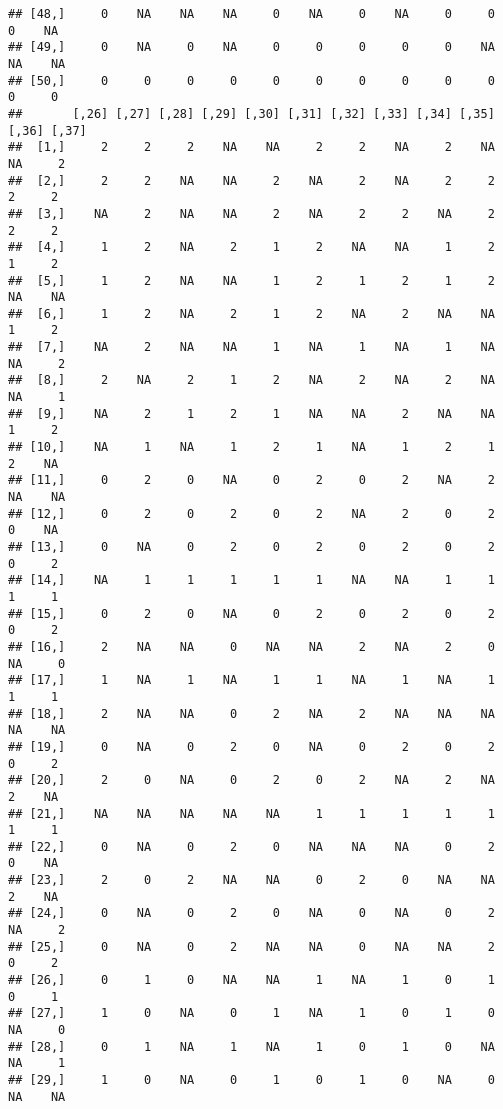 \documentclass[
]{article}
\begin{document}
\begin{verbatim}
## [48,]     0    NA    NA    NA     0    NA     0    NA     0     0     0    NA
## [49,]     0    NA     0    NA     0     0     0     0     0    NA    NA    NA
## [50,]     0     0     0     0     0     0     0     0     0     0     0     0
##       [,26] [,27] [,28] [,29] [,30] [,31] [,32] [,33] [,34] [,35] [,36] [,37]
##  [1,]     2     2     2    NA    NA     2     2    NA     2    NA    NA     2
##  [2,]     2     2    NA    NA     2    NA     2    NA     2     2     2     2
##  [3,]    NA     2    NA    NA     2    NA     2     2    NA     2     2     2
##  [4,]     1     2    NA     2     1     2    NA    NA     1     2     1     2
##  [5,]     1     2    NA    NA     1     2     1     2     1     2    NA    NA
##  [6,]     1     2    NA     2     1     2    NA     2    NA    NA     1     2
##  [7,]    NA     2    NA    NA     1    NA     1    NA     1    NA    NA     2
##  [8,]     2    NA     2     1     2    NA     2    NA     2    NA    NA     1
##  [9,]    NA     2     1     2     1    NA    NA     2    NA    NA     1     2
## [10,]    NA     1    NA     1     2     1    NA     1     2     1     2    NA
## [11,]     0     2     0    NA     0     2     0     2    NA     2    NA    NA
## [12,]     0     2     0     2     0     2    NA     2     0     2     0    NA
## [13,]     0    NA     0     2     0     2     0     2     0     2     0     2
## [14,]    NA     1     1     1     1     1    NA    NA     1     1     1     1
## [15,]     0     2     0    NA     0     2     0     2     0     2     0     2
## [16,]     2    NA    NA     0    NA    NA     2    NA     2     0    NA     0
## [17,]     1    NA     1    NA     1     1    NA     1    NA     1     1     1
## [18,]     2    NA    NA     0     2    NA     2    NA    NA    NA    NA    NA
## [19,]     0    NA     0     2     0    NA     0     2     0     2     0     2
## [20,]     2     0    NA     0     2     0     2    NA     2    NA     2    NA
## [21,]    NA    NA    NA    NA    NA     1     1     1     1     1     1     1
## [22,]     0    NA     0     2     0    NA    NA    NA     0     2     0    NA
## [23,]     2     0     2    NA    NA     0     2     0    NA    NA     2    NA
## [24,]     0    NA     0     2     0    NA     0    NA     0     2    NA     2
## [25,]     0    NA     0     2    NA    NA     0    NA    NA     2     0     2
## [26,]     0     1     0    NA    NA     1    NA     1     0     1     0     1
## [27,]     1     0    NA     0     1    NA     1     0     1     0    NA     0
## [28,]     0     1    NA     1    NA     1     0     1     0    NA    NA     1
## [29,]     1     0    NA     0     1     0     1     0    NA     0    NA    NA

\end{verbatim}
\end{document}
